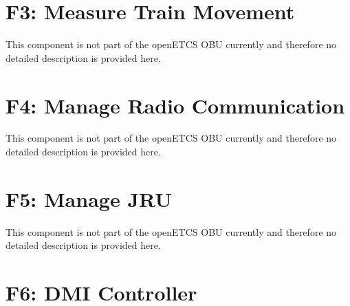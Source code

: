 \documentclass[oneside]{template/openetcs_report}
\begin{document}



















\chapter{F3: Measure Train Movement}
This component is not part of the openETCS OBU currently and therefore no detailed description is provided here.

\chapter{F4: Manage Radio Communication}
This component is not part of the openETCS OBU currently and therefore no detailed description is provided here.

\chapter{F5: Manage JRU}
This component is not part of the openETCS OBU currently and therefore no detailed description is provided here.

\chapter{F6: DMI Controller}







\end{document}
